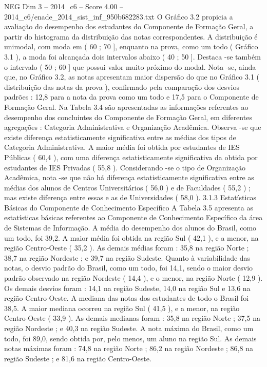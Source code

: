 \begin{textsample}{NEG Dim 3 – 2014\_c6 – Score 4.00 – 2014\_c6/enade\_2014\_sist\_inf\_950b682283.txt}
O Gráfico 3.2 propicia a avaliação do desempenho dos estudantes do Componente de Formação Geral, a partir do histograma da distribuição das notas correspondentes.
A distribuição é unimodal, com moda em ( 60 ; 70 ], enquanto na prova, como um todo ( Gráfico 3.1 ), a moda foi alcançada dois intervalos abaixo ( 40 ; 50 ].
Destaca -se também o intervalo ( 50 ; 60 ] que possui valor muito próximo do modal.
Nota -se, ainda que, no Gráfico 3.2, as notas apresentam maior dispersão do que no Gráfico 3.1 ( distribuição das notas da prova ), confirmado pela comparação dos desvios padrões : 12,8 para a nota da prova como um todo e 17,5 para o Componente de Formação Geral.
Na Tabela 3.4 são apresentadas as informações referentes ao desempenho dos concluintes do Componente de Formação Geral, em diferentes agregações : Categoria Administrativa e Organização Acadêmica.
Observa -se que existe diferença estatisticamente significativa entre as médias dos tipos de Categoria Administrativa.
A maior média foi obtida por estudantes de IES Públicas ( 60,4 ), com uma diferença estatisticamente significativa da obtida por estudantes de IES Privadas ( 55,8 ).
Considerando -se o tipo de Organização Acadêmica, nota -se que não há diferença estatisticamente significativa entre as médias dos alunos de Centros Universitários ( 56,0 ) e de Faculdades ( 55,2 ) ; mas existe diferença entre essas e as de Universidades ( 58,0 ). 3.1.3 Estatísticas Básicas do Componente de Conhecimento Específico A Tabela 3.5 apresenta as estatísticas básicas referentes ao Componente de Conhecimento Específico da área de Sistemas de Informação.
A média do desempenho dos alunos do Brasil, como um todo, foi 39,2.
A maior média foi obtida na região Sul ( 42,1 ), e a menor, na região Centro-Oeste ( 35,2 ).
As demais médias foram : 35,8 na região Norte ; 38,7 na região Nordeste ; e 39,7 na região Sudeste.
Quanto à variabilidade das notas, o desvio padrão do Brasil, como um todo, foi 14,1, sendo o maior desvio padrão observado na região Nordeste ( 14,4 ), e o menor, na região Norte ( 12,9 ).
Os demais desvios foram : 14,1 na região Sudeste, 14,0 na região Sul e 13,6 na região Centro-Oeste.
A mediana das notas dos estudantes de todo o Brasil foi 38,5.
A maior mediana ocorreu na região Sul ( 41,5 ), e a menor, na região Centro-Oeste ( 33,9 ).
As demais medianas foram : 35,8 na região Norte ; 37,5 na região Nordeste ; e 40,3 na região Sudeste.
A nota máxima do Brasil, como um todo, foi 89,0, sendo obtida por, pelo menos, um aluno na região Sul.
As demais notas máximas foram : 74,8 na região Norte ; 86,2 na região Nordeste ; 86,8 na região Sudeste ; e 81,6 na região Centro-Oeste.

\end{textsample}
